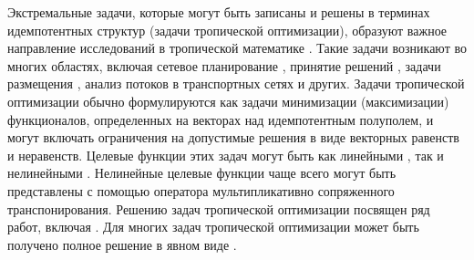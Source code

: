 \documentclass[specialist,
               substylefile = spbu.rtx,
               subf,href,colorlinks=true, 12pt]{disser}
\theoremstyle{definition}
\begin{document}
  
  
Экстремальные задачи, которые могут быть записаны и решены в терминах идемпотентных структур (задачи тропической оптимизации), образуют важное направление исследований в тропической математике \cite{Krivulin2014Tropical, Krivulin2015Extremal}. 
Такие задачи возникают во многих областях, включая сетевое планирование \cite{Cuninghame1962Describing,Cuninghame1979Minimax,Krivulin2017Tropicaloptimization}, принятие решений \cite{Elsner2004MaxAlgebra, Elsner2010MaxAlgebra,Krivulin2016Using,Krivulin2017Application,Krivulin2019Tropical},  задачи размещения \cite{Krivulin2011Extremal, Krivulin2011Algebraic,Krivulin2012New}, анализ потоков в транспортных сетях \cite{Zimmermann1981Linear, Zimmermann2006Interval} и других. 
Задачи тропической оптимизации обычно формулируются как задачи минимизации (максимизации) функционалов, определенных на векторах над идемпотентным полуполем, и могут включать ограничения на допустимые решения в виде векторных равенств и неравенств.
Целевые функции этих задач могут быть как линейными \cite{Zimmermann1981Linear}, так и нелинейными \cite{Cuninghame1976Projections,Cuninghame1979Minimax}. 
Нелинейные целевые функции чаще всего могут быть представлены с помощью оператора мультипликативно сопряженного транспонирования.
Решению задач тропической оптимизации посвящен ряд работ, включая \cite{Cuninghame1979Minimax,Zimmermann1981Linear,Krivulin2009Methods, Butkovic2010MaxLinear,Krivulin2014Tropical, Krivulin2015Extremal}. Для многих задач тропической оптимизации может быть получено полное решение в явном виде \cite{Zimmermann1981Linear,Cuninghame1976Projections,Krivulin2014Tropical, Krivulin2015Extremal,Krivulin2011Extremal,Krivulin2016Using}.



\end{document}
